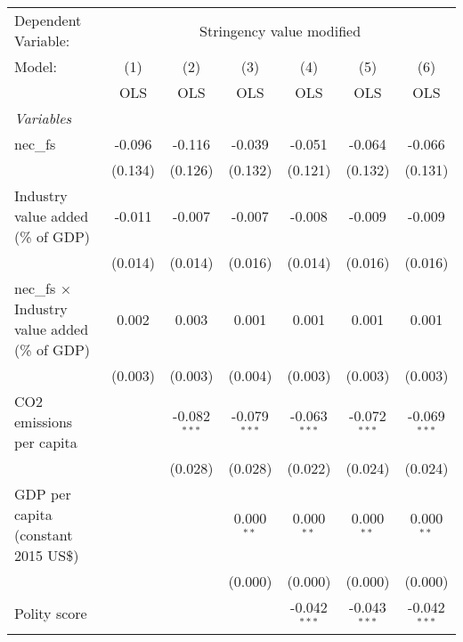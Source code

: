 
\begingroup
\centering
\begin{tabular}{lcccccc}
   \toprule
   Dependent Variable: & \multicolumn{6}{c}{Stringency value modified}\\
   Model:                                               & (1)     & (2)            & (3)            & (4)            & (5)            & (6)\\  
                                                        &  OLS    & OLS            & OLS            & OLS            & OLS            & OLS\\  
   \midrule
   \emph{Variables}\\
   nec\_fs                                              & -0.096  & -0.116         & -0.039         & -0.051         & -0.064         & -0.066\\   
                                                        & (0.134) & (0.126)        & (0.132)        & (0.121)        & (0.132)        & (0.131)\\   
   Industry value added (\% of GDP)                     & -0.011  & -0.007         & -0.007         & -0.008         & -0.009         & -0.009\\   
                                                        & (0.014) & (0.014)        & (0.016)        & (0.014)        & (0.016)        & (0.016)\\   
   nec\_fs $\times$ Industry value added (\% of GDP)    & 0.002   & 0.003          & 0.001          & 0.001          & 0.001          & 0.001\\   
                                                        & (0.003) & (0.003)        & (0.004)        & (0.003)        & (0.003)        & (0.003)\\   
   CO2 emissions per capita                             &         & -0.082$^{***}$ & -0.079$^{***}$ & -0.063$^{***}$ & -0.072$^{***}$ & -0.069$^{***}$\\   
                                                        &         & (0.028)        & (0.028)        & (0.022)        & (0.024)        & (0.024)\\   
   GDP per capita (constant 2015 US\$)                  &         &                & 0.000$^{**}$   & 0.000$^{**}$   & 0.000$^{**}$   & 0.000$^{**}$\\   
                                                        &         &                & (0.000)        & (0.000)        & (0.000)        & (0.000)\\   
   Polity score                                         &         &                &                & -0.042$^{***}$ & -0.043$^{***}$ & -0.042$^{***}$\\   

\end{tabular}
